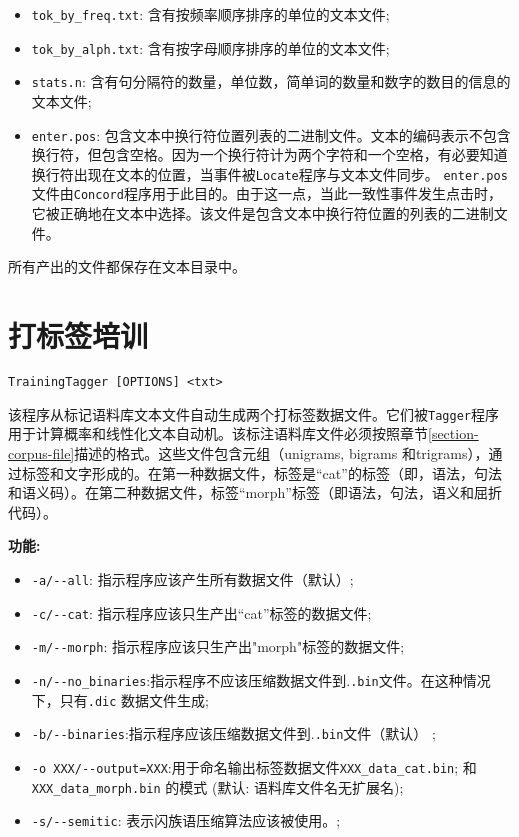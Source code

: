 \begin{itemize}
  \item \verb+tok_by_freq.txt+: 含有按频率顺序排序的单位的文本文件;
  \item \verb+tok_by_alph.txt+: 含有按字母顺序排序的单位的文本文件;

  \item \verb+stats.n+: 含有句分隔符的数量，单位数，简单词的数量和数字的数目的信息的文本文件;


  \item \verb+enter.pos+: 包含文本中换行符位置列表的二进制文件。文本的编码表示不包含换行符，但包含空格。因为一个换行符计为两个字符和一个空格，有必要知道换行符出现在文本的位置，当事件被\verb+Locate+程序与文本文件同步。 \verb+enter.pos+文件由\verb+Concord+程序用于此目的。由于这一点，当此一致性事件发生点击时，它被正确地在文本中选择。该文件是包含文本中换行符位置的列表的二进制文件。

\end{itemize}

\bigskip
\noindent 所有产出的文件都保存在文本目录中。






\section{打标签培训}
\verb+TrainingTagger [OPTIONS] <txt>+
\label{section-TrainingTagger}

\bigskip
\noindent {}
该程序从标记语料库文本文件自动生成两个打标签数据文件。它们被\verb+Tagger+程序用于计算概率和线性化文本自动机。该标注语料库文件必须按照章节\ref{section-corpus-file}描述的格式。这些文件包含元组（unigrams, bigrams 和trigrams），通过标签和文字形成的。在第一种数据文件，标签是“cat”的标签（即，语法，句法和语义码）。在第二种数据文件，标签“morph”标签（即语法，句法，语义和屈折代码）。

\bigskip
\noindent \textbf{功能:}
\begin{itemize}
\item \verb+-a/--all+: 指示程序应该产生所有数据文件（默认）;
\item \verb+-c/--cat+: 指示程序应该只生产出“cat”标签的数据文件;
  \item \verb+-m/--morph+: 指示程序应该只生产出"morph"标签的数据文件;
  \item \verb+-n/--no_binaries+:指示程序不应该压缩数据文件到.\verb+.bin+文件。在这种情况下，只有\verb+.dic+ 数据文件生成;
  \item \verb+-b/--binaries+:指示程序应该压缩数据文件到.\verb+.bin+文件（默认） ;
  \item \verb+-o XXX/--output=XXX+:用于命名输出标签数据文件\verb+XXX_data_cat.bin+; 和 \verb+XXX_data_morph.bin+ 的模式 (默认: 语料库文件名无扩展名);
  \item \verb+-s/--semitic+: 表示闪族语压缩算法应该被使用。;
\end{itemize}

